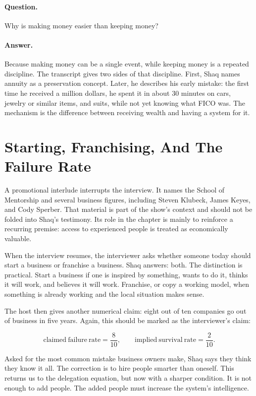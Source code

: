 \paragraph{Question.}
Why is making money easier than keeping money?

\paragraph{Answer.}
Because making money can be a single event, while keeping money is a repeated discipline. The transcript gives two sides of that discipline. First, Shaq names annuity as a preservation concept. Later, he describes his early mistake: the first time he received a million dollars, he spent it in about 30 minutes on cars, jewelry or similar items, and suits, while not yet knowing what FICO was. The mechanism is the difference between receiving wealth and having a system for it.

\section{Starting, Franchising, And The Failure Rate}

A promotional interlude interrupts the interview. It names the School of Mentorship and several business figures, including Steven Klubeck, James Keyes, and Cody Sperber. That material is part of the show's context and should not be folded into Shaq's testimony. Its role in the chapter is mainly to reinforce a recurring premise: access to experienced people is treated as economically valuable.

When the interview resumes, the interviewer asks whether someone today should start a business or franchise a business. Shaq answers: both. The distinction is practical. Start a business if one is inspired by something, wants to do it, thinks it will work, and believes it will work. Franchise, or copy a working model, when something is already working and the local situation makes sense.

The host then gives another numerical claim: eight out of ten companies go out of business in five years. Again, this should be marked as the interviewer's claim:

\begin{equation}
\mathrm{claimed\ failure\ rate} = \frac{8}{10},
\qquad
\mathrm{implied\ survival\ rate} = \frac{2}{10}.
\end{equation}

Asked for the most common mistake business owners make, Shaq says they think they know it all. The correction is to hire people smarter than oneself. This returns us to the delegation equation, but now with a sharper condition. It is not enough to add people. The added people must increase the system's intelligence.


